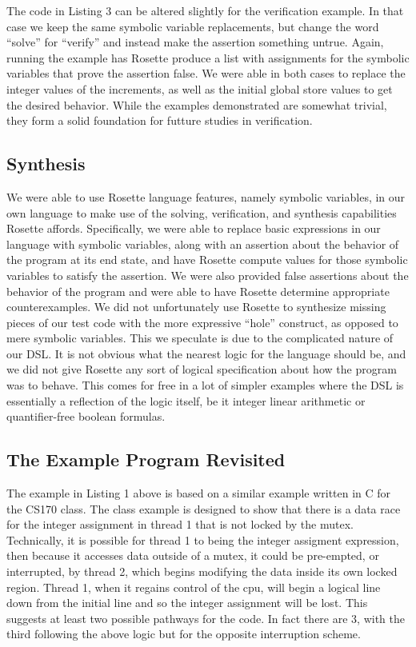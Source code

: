 The code in Listing 3 can be altered slightly for the verification example.  In that case we keep the same symbolic variable replacements, but change the word ``solve'' for ``verify'' and instead make the assertion something untrue.  Again, running the example has Rosette produce a list with assignments for the symbolic variables that prove the assertion false.  We were able in both cases to replace the integer values of the increments, as well as the initial global store values to get the desired behavior.  While the examples demonstrated are somewhat trivial, they form a solid foundation for futture studies in verification.  

\subsection{Synthesis}
We were able to use Rosette language features, namely symbolic variables, in our own language to make use of the solving, verification, and synthesis capabilities Rosette affords.  Specifically, we were able to replace basic expressions in our language with symbolic variables, along with an assertion about the behavior of the program at its end state, and have Rosette compute values for those symbolic variables to satisfy the assertion.  We were also provided false assertions about the behavior of the program and were able to have Rosette determine appropriate counterexamples.  We did not unfortunately use Rosette to synthesize missing pieces of our test code with the more expressive ``hole'' construct, as opposed to mere symbolic variables.  This we speculate is due to the complicated nature of our DSL.  It is not obvious what the nearest logic for the language should be, and we did not give Rosette any sort of logical specification about how the program was to behave.  This comes for free in a lot of simpler examples where the DSL is essentially a reflection of the logic itself, be it integer linear arithmetic or quantifier-free boolean formulas.  

\subsection{The Example Program Revisited}
The example in Listing 1 above is based on a similar example written in C for the CS170 class.  The class example is designed to show that there is a data race for the integer assignment in thread 1 that is not locked by the mutex.  Technically, it is possible for thread 1 to being the integer assigment expression, then because it accesses data outside of a mutex, it could be pre-empted, or interrupted, by thread 2, which begins modifying the data inside its own locked region.  Thread 1, when it regains control of the cpu, will begin a logical line down from the initial line and so the integer assignment will be lost.  This suggests at least two possible pathways for the code.  In fact there are 3, with the third following the above logic but for the opposite interruption scheme.

